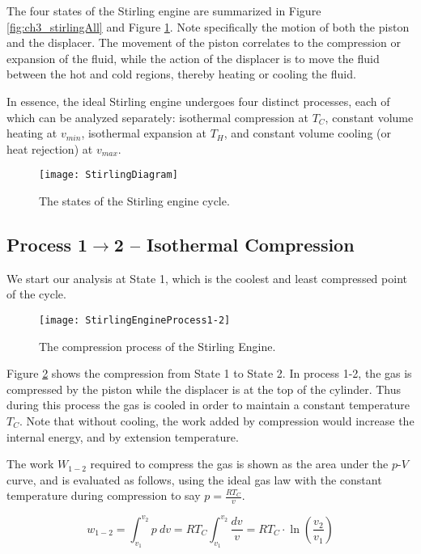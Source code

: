 The four states of the Stirling engine are summarized in Figure \ref{fig:ch3_stirlingAll} and Figure \ref{fig:ch3_stirlingDiagram}.  Note specifically the motion of both the piston and the displacer.  The movement of the piston correlates to the compression or expansion of the fluid, while the action of the displacer is to move the fluid between the hot and cold regions, thereby heating or cooling the fluid.

In essence, the ideal Stirling engine undergoes four distinct processes, each of which can be analyzed separately: isothermal compression at $T_C$, constant volume heating at $v_{min}$, isothermal expansion at $T_H$, and constant volume cooling (or heat rejection) at $v_{max}$.

\begin{figure}[H]
\centering
\texttt{[image: StirlingDiagram]}
\caption{The states of the Stirling engine cycle.}
\label{fig:ch3_stirlingDiagram}
\end{figure}

\subsection{Process 1$\rightarrow$2 -- Isothermal Compression}
We start our analysis at State 1, which is the coolest and least compressed point of the cycle.

\begin{figure}[H]
\centering
\texttt{[image: StirlingEngineProcess1-2]}
\caption{The compression process of the Stirling Engine.}
\label{fig:ch3_stirling12}
\end{figure}

Figure \ref{fig:ch3_stirling12} shows the compression from State 1 to State 2.  In process 1-2, the gas is compressed by the piston while the displacer is at the top of the cylinder. Thus during this process the gas is cooled in order to maintain a constant temperature $T_C$.  Note that without cooling, the work added by compression would increase the internal energy, and by extension temperature.

The work $W_{1-2}$ required to compress the gas is shown as the area under the $p$-$V$ curve, and is evaluated as follows, using the ideal gas law with the constant temperature during compression to say $p = \frac{R T_C}{v}$.

\begin{equation} \label{eq:stirlingCompWork}
  w_{1-2} = \int_{v_1}^{v_2} p\:dv=R T_C \int_{v_1}^{v_2} \frac{dv}{v}=RT_C\cdot  \ln\left(\frac{v_2}{v_1}\right)
\end{equation}

